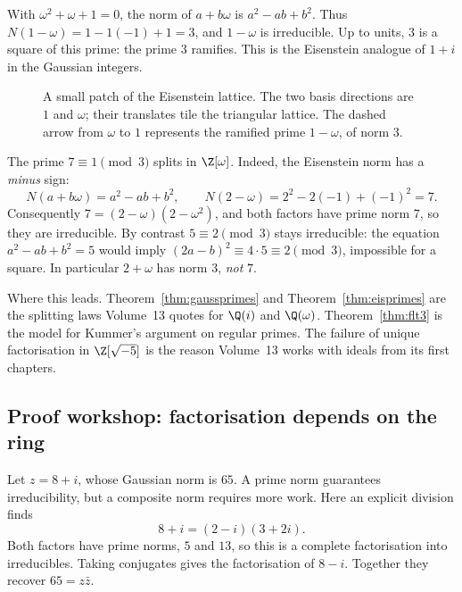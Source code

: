 \begin{examplex}
With $\omega^2+\omega+1=0$, the norm of $a+b\omega$ is $a^2-ab+b^2$. Thus $N(1-\omega)=1-1(-1)+1=3$, and $1-\omega$ is irreducible. Up to units, $3$ is a square of this prime: the prime $3$ ramifies. This is the Eisenstein analogue of $1+i$ in the Gaussian integers.
\end{examplex}

\begin{figure}[ht]
\centering
{}
\caption{A small patch of the Eisenstein lattice. The two basis directions are $1$ and $\omega$; their translates tile the triangular lattice. The dashed arrow from $\omega$ to $1$ represents the ramified prime $1-\omega$, of norm $3$.}
\label{fig:t1-eisenstein}
\end{figure}

\begin{examplex}
The prime $7\equiv1\pmod3$ splits in $\Z[\omega]$. Indeed, the
Eisenstein norm has a \emph{minus} sign:
\[
N(a+b\omega)=a^2-ab+b^2,\qquad
N(2-\omega)=2^2-2(-1)+(-1)^2=7.
\]
Consequently
$7=(2-\omega)(2-\omega^2)$, and both factors have prime
norm $7$, so they are irreducible. By contrast $5\equiv2\pmod3$
stays irreducible: the equation $a^2-ab+b^2=5$ would imply
$(2a-b)^2\equiv4\cdot5\equiv2\pmod3$, impossible for a square.
In particular $2+\omega$ has norm $3$, \emph{not} $7$.
\end{examplex}

\begin{beauty}
Where this leads. Theorem~\ref{thm:gaussprimes} and Theorem~\ref{thm:eisprimes} are the splitting laws Volume~13 quotes for $\Q(i)$ and $\Q(\omega)$. Theorem~\ref{thm:flt3} is the model for Kummer's argument on regular primes. The failure of unique factorisation in $\Z[\sqrt{-5}]$ is the reason Volume~13 works with ideals from its first chapters.
\end{beauty}

\subsection*{Proof workshop: factorisation depends on the ring}

Let $z=8+i$, whose Gaussian norm is $65$. A prime norm guarantees irreducibility, but a composite norm requires more work. Here an explicit division finds
\[
8+i=(2-i)(3+2i).
\]
Both factors have prime norms, $5$ and $13$, so this is a complete factorisation into irreducibles. Taking conjugates gives the factorisation of $8-i$. Together they recover $65=z\bar z$.


